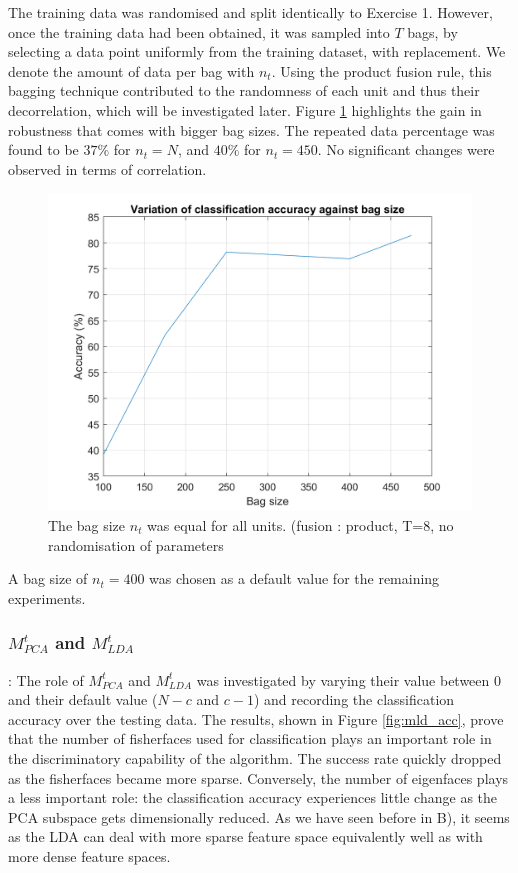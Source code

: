 \documentclass[10pt,technote]{IEEEtran}
\begin{document}
The training data was randomised and split identically to Exercise 1. However, once the training data had been obtained, it was sampled into $T$ bags, by selecting a data point uniformly from the training dataset, with replacement. We denote the amount of data per bag with $n_t$. Using the product fusion rule, this bagging technique contributed to the randomness of each unit and thus their decorrelation, which will be investigated later. Figure \ref{fig:acc_vs_bag} highlights the gain in robustness that comes with bigger bag sizes. The repeated data percentage was found to be $37 \%$ for $n_t = N$, and $40 \%$ for $n_t = 450$. No significant changes were observed in terms of correlation.
\begin{figure}[htb!]
    \centering
    \includegraphics[width=\linewidth]{../results/ex2LDAEnsemble/acc_vs_bag_size.png}
    \caption{The bag size $n_t$ was equal for all units. (fusion : product, T=8, no randomisation of parameters}
    \label{fig:acc_vs_bag}
\end{figure}

A bag size of $n_t = 400$ was chosen as a default value for the remaining experiments.

\subsubsection{$M_{PCA}^t$ and $M_{LDA}^t$}:
The role of $M_{PCA}^t$ and $M_{LDA}^t$ was investigated by varying their value between 0 and their default value ($N - c$ and $c - 1$) and recording the classification accuracy over the testing data. The results, shown in Figure \ref{fig:mld_acc}, prove that the number of fisherfaces used for classification plays an important role in the discriminatory capability of the algorithm. The success rate quickly dropped as the fisherfaces became more sparse. Conversely, the number of eigenfaces plays a less important role: the classification accuracy experiences little change as the PCA subspace gets dimensionally reduced. As we have seen before in B), it seems as the LDA can deal with more sparse feature space equivalently well as with more dense feature spaces.
\end{document}
